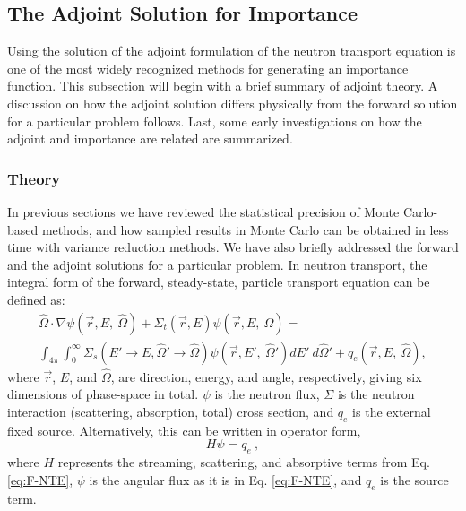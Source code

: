 \subsection{The Adjoint Solution for Importance}
\label{sec:AdjointImportance}

Using the solution of the adjoint formulation of the neutron transport
equation is one of the most widely recognized methods for generating
an importance function. This subsection will begin with a brief summary of
adjoint theory. A discussion on how
the adjoint solution differs physically from the forward solution for a
particular problem follows. Last, some early investigations on how the
adjoint
and importance are related are summarized.

\subsubsection{Theory}

In previous sections we have reviewed the statistical precision of Monte
Carlo-based methods, and how sampled results in Monte Carlo can be obtained
in less time
with variance reduction methods. We have also briefly addressed the forward and
the adjoint solutions for a particular problem. In neutron transport, the
integral form of the forward, steady-state, particle transport equation can be
defined as:
\begin{multline}
\hat\Omega \cdot \nabla \psi
        (\vec {r} ,E,\:\hat\Omega)+\Sigma _{ t }
        (\vec{r},E)\psi (\vec { r } ,E,\:\hat\Omega) = \\
        \int _{ 4\pi  } \int _{ 0 }^{ \infty  } \Sigma _{ s }(E'\rightarrow E,
        \hat\Omega'\rightarrow\hat\Omega)\psi (\vec { r } ,E',\: \hat\Omega')dE'
        \:d\hat\Omega' + q_{e}(\vec { r } ,E, \:\hat\Omega),
\label{eq:F-NTE}
\end{multline}
where $\vec { r }$, $E$, and $\hat\Omega$, are direction, energy, and angle,
respectively, giving six dimensions of phase-space in total.
$\psi$ is the neutron flux, $\Sigma$ is the neutron
interaction (scattering, absorption, total) cross section, and $q_{e}$ is the
external fixed source. Alternatively, this can be written in operator form,
\begin{equation}
  H \psi = q_{e} \:,
\label{eq:F-NTE2}
\end{equation}
where $H$ represents the streaming, scattering, and absorptive terms from Eq.
\eqref{eq:F-NTE}, $\psi$ is the angular flux as it is in Eq. \eqref{eq:F-NTE}, and
$q_{e}$ is the source term.

